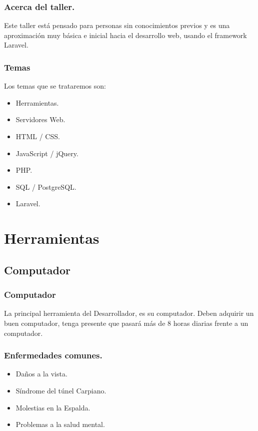 \documentclass[12pt]{beamer}
\begin{document}
\begin{frame}
\frametitle{Acerca del taller.}

Este taller está pensado para personas sin conocimientos previos y es una aproximación muy básica e inicial hacia el desarrollo web, usando el framework Laravel.
\end{frame}


\begin{frame}
\frametitle{Temas}
Los temas que se trataremos son:
\begin{itemize}
 \item<1-> Herramientas.
 \item<2-> Servidores Web.
 \item<3-> HTML / CSS.
 \item<4-> JavaScript / jQuery.
 \item<5-> PHP.
 \item<6-> SQL / PostgreSQL.
 \item<7-> Laravel.
\end{itemize}
\end{frame}

\section{Herramientas}

\subsection{Computador}

\begin{frame}
 \frametitle{Computador}
 La principal herramienta del Desarrollador, es su \alert{computador}.
 \newline
 Deben adquirir un \alert{buen} computador, tenga presente que pasará más de 8 horas diarias frente a un computador.
\end{frame}


\begin{frame}
 \frametitle{Enfermedades comunes.}
 \begin{itemize}
  \item<2-> Daños a la vista.
  \item<3-> Síndrome del túnel Carpiano.
  \item<4-> Molestias en la Espalda.
  \item<5-> Problemas a la salud mental.
 \end{itemize}
\end{frame}
\end{document}

